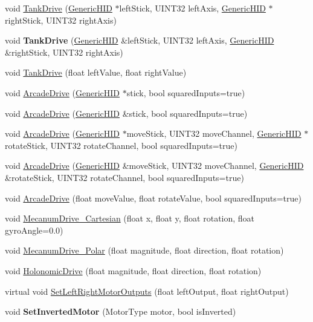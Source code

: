 \begin{DoxyCompactItemize}
\item 
void \hyperlink{classRobotDrive_ae24f3802fb94ea30c716ad8a553a1b6d}{TankDrive} (\hyperlink{classGenericHID}{GenericHID} $\ast$leftStick, UINT32 leftAxis, \hyperlink{classGenericHID}{GenericHID} $\ast$rightStick, UINT32 rightAxis)
\item 
\hypertarget{classRobotDrive_a585d112865f5607d966954ae942a86bd}{
void {\bfseries TankDrive} (\hyperlink{classGenericHID}{GenericHID} \&leftStick, UINT32 leftAxis, \hyperlink{classGenericHID}{GenericHID} \&rightStick, UINT32 rightAxis)}
\label{classRobotDrive_a585d112865f5607d966954ae942a86bd}

\item 
void \hyperlink{classRobotDrive_ac6a60f5d8ed48bae4fde0d8828ffeafe}{TankDrive} (float leftValue, float rightValue)
\item 
void \hyperlink{classRobotDrive_a6f064885fe1ec7611c6d7593148b7855}{ArcadeDrive} (\hyperlink{classGenericHID}{GenericHID} $\ast$stick, bool squaredInputs=true)
\item 
void \hyperlink{classRobotDrive_a5ebb511c01ab5050a7f995e3f64b7ef0}{ArcadeDrive} (\hyperlink{classGenericHID}{GenericHID} \&stick, bool squaredInputs=true)
\item 
void \hyperlink{classRobotDrive_aa60942896141c265d0ad24f21b647dff}{ArcadeDrive} (\hyperlink{classGenericHID}{GenericHID} $\ast$moveStick, UINT32 moveChannel, \hyperlink{classGenericHID}{GenericHID} $\ast$rotateStick, UINT32 rotateChannel, bool squaredInputs=true)
\item 
void \hyperlink{classRobotDrive_a5c3a97e06c272c3418c0b219fa574a0a}{ArcadeDrive} (\hyperlink{classGenericHID}{GenericHID} \&moveStick, UINT32 moveChannel, \hyperlink{classGenericHID}{GenericHID} \&rotateStick, UINT32 rotateChannel, bool squaredInputs=true)
\item 
void \hyperlink{classRobotDrive_ac95118d7b535c4f3fb3d56ba5b041e40}{ArcadeDrive} (float moveValue, float rotateValue, bool squaredInputs=true)
\item 
void \hyperlink{classRobotDrive_a2e7fa1a9713332281012e8aae5d9570e}{MecanumDrive\_\-Cartesian} (float x, float y, float rotation, float gyroAngle=0.0)
\item 
void \hyperlink{classRobotDrive_a3ba6d4ec2c07575543c4f47d348332f1}{MecanumDrive\_\-Polar} (float magnitude, float direction, float rotation)
\item 
void \hyperlink{classRobotDrive_ad21b09eed120e95f1b5741a26f2f9084}{HolonomicDrive} (float magnitude, float direction, float rotation)
\item 
virtual void \hyperlink{classRobotDrive_a6f17b92a6867d512188b497f192f0715}{SetLeftRightMotorOutputs} (float leftOutput, float rightOutput)
\item 
\hypertarget{classRobotDrive_a707c3160f50bf6ddf72660f1afefdc0c}{
void {\bfseries SetInvertedMotor} (MotorType motor, bool isInverted)}
\label{classRobotDrive_a707c3160f50bf6ddf72660f1afefdc0c}


\end{DoxyCompactItemize}
